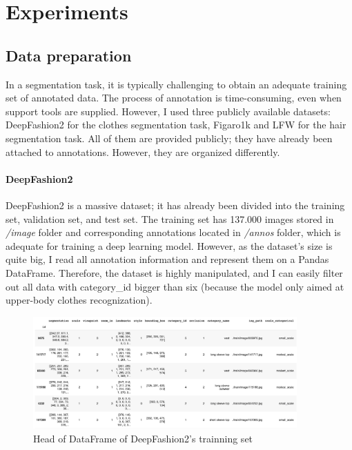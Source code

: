 \section{Experiments} \label{sec:experiments}
       

       
\subsection{Data preparation}

In a segmentation task, it is typically challenging to obtain an adequate training set of annotated data. The process of annotation is time-consuming, even when support tools are supplied. However, I used three publicly available datasets: DeepFashion2 for the clothes segmentation task, Figaro1k and LFW for the hair segmentation task. All of them are provided publicly; they have already been attached to annotations. However, they are organized differently. \par

\paragraph{DeepFashion2}
DeepFashion2 is a massive dataset; it has already been divided into the training set, validation set, and test set. The training set has 137.000 images stored in \emph{/image} folder and corresponding annotations located in \emph{/annos} folder, which is adequate for training a deep learning model. However, as the dataset's size is quite big, I read all annotation information and represent them on a Pandas DataFrame. Therefore, the dataset is highly manipulated, and I can easily filter out all data with category\_id bigger than six (because the model only aimed at upper-body clothes recognization). \par

\begin{figure} [H]
    \centering
    \captionsetup{justification=centering}
    \includegraphics[width=0.9\textwidth]{chapter4/image/dataframe.png}
    \caption{Head of DataFrame of DeepFashion2’s trainning set}
    \label{fig:df}
\end{figure}


